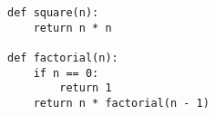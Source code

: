 \begin{lstlisting}
def square(n):
    return n * n

def factorial(n):
    if n == 0:
        return 1
    return n * factorial(n - 1)
\end{lstlisting}